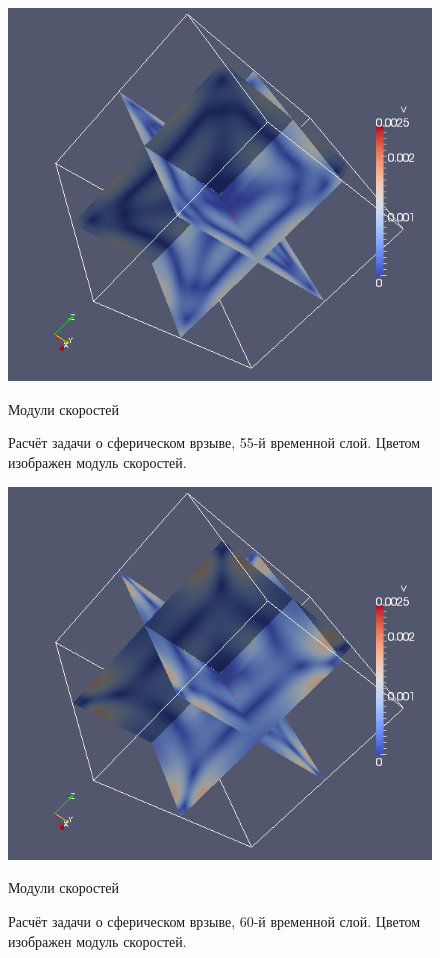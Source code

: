 \begin{figure}[htp]
\centering
\includegraphics[width=\textwidth]{png/spherical-explosion-test/v-scalar/0055.png}
\caption{Модули скоростей}
\caption{Расчёт задачи о сферическом врзыве, 55-й временной слой. Цветом изображен модуль скоростей.}
\end{figure}

\begin{figure}[htp]
\centering
\includegraphics[width=\textwidth]{png/spherical-explosion-test/v-scalar/0060.png}
\caption{Модули скоростей}
\caption{Расчёт задачи о сферическом врзыве, 60-й временной слой. Цветом изображен модуль скоростей.}
\end{figure}

